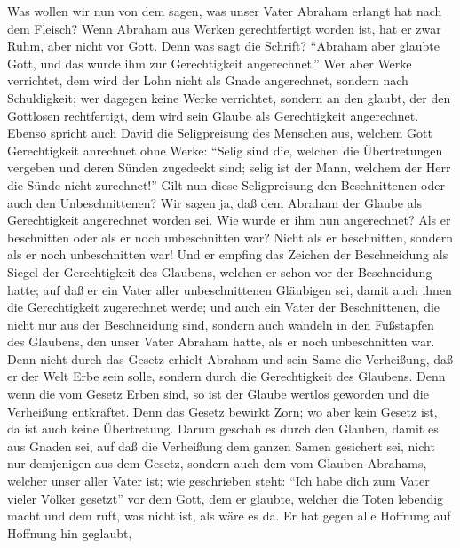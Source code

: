  Was wollen wir nun von dem sagen, was unser Vater Abraham
erlangt hat nach dem Fleisch?  Wenn Abraham aus Werken
gerechtfertigt worden ist, hat er zwar Ruhm, aber nicht vor Gott.
 Denn was sagt die Schrift? ``Abraham aber glaubte Gott,
und das wurde ihm zur Gerechtigkeit angerechnet.''  Wer
aber Werke verrichtet, dem wird der Lohn nicht als Gnade angerechnet,
sondern nach Schuldigkeit;  wer dagegen keine Werke
verrichtet, sondern an den glaubt, der den Gottlosen rechtfertigt, dem
wird sein Glaube als Gerechtigkeit angerechnet.  Ebenso
spricht auch David die Seligpreisung des Menschen aus, welchem Gott
Gerechtigkeit anrechnet ohne Werke:  ``Selig sind die,
welchen die Übertretungen vergeben und deren Sünden zugedeckt sind;
 selig ist der Mann, welchem der Herr die Sünde nicht
zurechnet!''  Gilt nun diese Seligpreisung den
Beschnittenen oder auch den Unbeschnittenen? Wir sagen ja, daß dem
Abraham der Glaube als Gerechtigkeit angerechnet worden sei.
 Wie wurde er ihm nun angerechnet? Als er beschnitten
oder als er noch unbeschnitten war? Nicht als er beschnitten, sondern
als er noch unbeschnitten war!  Und er empfing das
Zeichen der Beschneidung als Siegel der Gerechtigkeit des Glaubens,
welchen er schon vor der Beschneidung hatte; auf daß er ein Vater aller
unbeschnittenen Gläubigen sei, damit auch ihnen die Gerechtigkeit
zugerechnet werde;  und auch ein Vater der Beschnittenen,
die nicht nur aus der Beschneidung sind, sondern auch wandeln in den
Fußstapfen des Glaubens, den unser Vater Abraham hatte, als er noch
unbeschnitten war.  Denn nicht durch das Gesetz erhielt
Abraham und sein Same die Verheißung, daß er der Welt Erbe sein solle,
sondern durch die Gerechtigkeit des Glaubens.  Denn wenn
die vom Gesetz Erben sind, so ist der Glaube wertlos geworden und die
Verheißung entkräftet.  Denn das Gesetz bewirkt Zorn; wo
aber kein Gesetz ist, da ist auch keine Übertretung. 
Darum geschah es durch den Glauben, damit es aus Gnaden sei, auf daß die
Verheißung dem ganzen Samen gesichert sei, nicht nur demjenigen aus dem
Gesetz, sondern auch dem vom Glauben Abrahams, welcher unser aller Vater
ist;  wie geschrieben steht: ``Ich habe dich zum Vater
vieler Völker gesetzt'' vor dem Gott, dem er glaubte, welcher die Toten
lebendig macht und dem ruft, was nicht ist, als wäre es da.
 Er hat gegen alle Hoffnung auf Hoffnung hin geglaubt,
